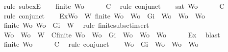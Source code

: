 \begin{isabellebody}
\ {\isacharparenleft}rule\ subexE{\isacharparenright}\isanewline
\ \ \isamarkupfalse%
\ {\isachardoublequoteopen}finite\ Wo{\isachardoublequoteclose}\isanewline
\ \ \ \ \isamarkupfalse%
\ C{}\ \isamarkupfalse%
\ {\isacharparenleft}rule\ conjunct{}{\isacharparenright}\isanewline
\ \ \isamarkupfalse%
\ {\isachardoublequoteopen}{\isasymnot}{\isacharparenleft}sat\ Wo{\isacharparenright}{\isachardoublequoteclose}\isanewline
\ \ \ \ \isamarkupfalse%
\ C{}\ \isamarkupfalse%
\ {\isacharparenleft}rule\ conjunct{}{\isacharparenright}\isanewline
\ \ \isamarkupfalse%
\ Ex{}{\isacharcolon}{\isachardoublequoteopen}{\isasymexists}Wo{\isacharprime}\ {\isasymsubseteq}\ W{\isachardot}\ finite\ Wo{\isacharprime}\ {\isasymand}\ {\isacharparenleft}Wo\ {\isacharequal}\ {\isacharbraceleft}Gi{\isacharbraceright}\ {\isasymunion}\ Wo{\isacharprime}\ {\isasymor}\ Wo\ {\isacharequal}\ Wo{\isacharprime}{\isacharparenright}{\isachardoublequoteclose}\isanewline
\ \ \ \ \isamarkupfalse%
\ {\isacartoucheopen}finite\ Wo{\isacartoucheclose}\ {\isacartoucheopen}Wo\ {\isasymsubseteq}\ {\isacharbraceleft}Gi{\isacharbraceright}\ {\isasymunion}\ W{\isacartoucheclose}\ \isamarkupfalse%
\ {\isacharparenleft}rule\ finite{\isacharunderscore}subset{\isacharunderscore}insert{}{\isacharparenright}\isanewline
\ \ \isamarkupfalse%
\ Wo{\isacharprime}\ \ {\isachardoublequoteopen}Wo{\isacharprime}\ {\isasymsubseteq}\ W{\isachardoublequoteclose}\ \ C{}{\isacharcolon}{\isachardoublequoteopen}finite\ Wo{\isacharprime}\ {\isasymand}\ {\isacharparenleft}Wo\ {\isacharequal}\ {\isacharbraceleft}Gi{\isacharbraceright}\ {\isasymunion}\ Wo{\isacharprime}\ {\isasymor}\ Wo\ {\isacharequal}\ Wo{\isacharprime}{\isacharparenright}{\isachardoublequoteclose}\isanewline
\ \ \ \ \isamarkupfalse%
\ Ex{}\ \isamarkupfalse%
\ blast\isanewline
\ \ \isamarkupfalse%
\ {\isachardoublequoteopen}finite\ Wo{\isacharprime}{\isachardoublequoteclose}\isanewline
\ \ \ \ \isamarkupfalse%
\ C{}\ \isamarkupfalse%
\ {\isacharparenleft}rule\ conjunct{}{\isacharparenright}\isanewline
\ \ \isamarkupfalse%
\ {\isachardoublequoteopen}Wo\ {\isacharequal}\ {\isacharbraceleft}Gi{\isacharbraceright}\ {\isasymunion}\ Wo{\isacharprime}\ {\isasymor}\ Wo\ {\isacharequal}\ Wo{\isacharprime}{\isachardoublequoteclose}\isanewline

\end{isabellebody}
